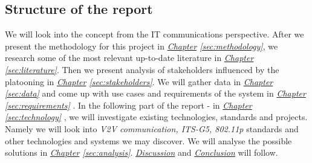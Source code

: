 \subsection{Structure of the report}
We will look into the concept from the IT communications perspective. After we present the methodology for this project in 
\textit{\hyperref[sec:methodology]{Chapter} \ref{sec:methodology}},
we research some of the most relevant up-to-date literature in 
\textit{\hyperref[sec:literature]{Chapter} \ref{sec:literature}}. 
Then we present analysis of stakeholders influenced by the platooning in 
\textit{\hyperref[sec:stakeholders]{Chapter} \ref{sec:stakeholders}}.
We will gather data in
\textit{\hyperref[sec:data]{Chapter} \ref{sec:data}}
and come up with use cases and requirements of the system in 
\textit{\hyperref[sec:requirements]{Chapter} \ref{sec:requirements}}
. In the following part of the report - in 
\textit{\hyperref[sec:technology]{Chapter} \ref{sec:technology}}
, we will investigate existing technologies, standards and projects. Namely we will look into \emph{V2V communication, ITS-G5, 802.11p} standards and other technologies and systems we may discover. We will analyse the possible solutions in 
\textit{\hyperref[sec:analysis]{Chapter} \ref{sec:analysis}}.
\hyperref[sec:discussion]{\textit{Discussion}} and \hyperref[sec:conclusion]{\textit{Conclusion}} will follow.
% 
% 

